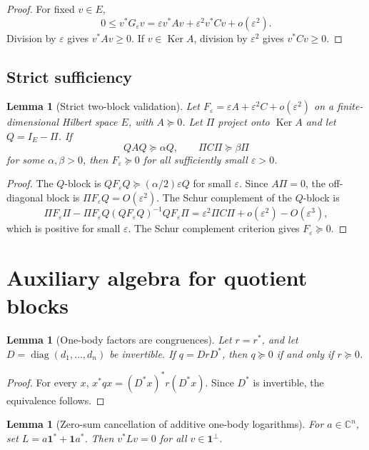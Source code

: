 \documentclass[11pt]{article}
\newtheorem{lemma}[theorem]{Lemma}
\newcommand{\one}{\mathbf 1}
\newcommand{\C}{\mathbb C}
\newcommand{\eps}{\varepsilon}
\newcommand{\diag}{\operatorname{diag}}
\newcommand{\Ker}{\operatorname{Ker}}
\begin{document}
\begin{proof}
For fixed \(v\in E\),
\[
  0\le v^*G_\eps v
  =\eps v^*Av+\eps^2v^*Cv+o(\eps^2).
\]
Division by \(\eps\) gives \(v^*Av\ge0\).  If \(v\in\Ker A\), division by \(\eps^2\) gives \(v^*Cv\ge0\).
\end{proof}

\subsection{Strict sufficiency}

\begin{lemma}[Strict two-block validation]
\label{lem:app-strict-validation}
Let \(F_\eps=\eps A+\eps^2C+o(\eps^2)\) on a finite-dimensional Hilbert space \(E\), with \(A\succeq0\).  Let \(\Pi\) project onto \(\Ker A\) and let \(Q=I_E-\Pi\).  If
\[
  QAQ\succeq\alpha Q,
  \qquad
  \Pi C\Pi\succeq\beta\Pi
\]
for some \(\alpha,\beta>0\), then \(F_\eps\succeq0\) for all sufficiently small \(\eps>0\).
\end{lemma}

\begin{proof}
The \(Q\)-block is \(QF_\eps Q\succeq(\alpha/2)\eps Q\) for small \(\eps\).  Since \(A\Pi=0\), the off-diagonal block is \(\Pi F_\eps Q=O(\eps^2)\).  The Schur complement of the \(Q\)-block is
\[
  \Pi F_\eps\Pi-
  \Pi F_\eps Q(QF_\eps Q)^{-1}QF_\eps\Pi
  =\eps^2\Pi C\Pi+o(\eps^2)-O(\eps^3),
\]
which is positive for small \(\eps\).  The Schur complement criterion gives \(F_\eps\succeq0\).
\end{proof}

\section{Auxiliary algebra for quotient blocks}
\label{app:quotient-algebra}

\begin{lemma}[One-body factors are congruences]
\label{lem:app-one-body}
Let \(r=r^*\), and let \(D=\diag(d_1,\ldots,d_n)\) be invertible.  If \(q=DrD^*\), then \(q\succeq0\) if and only if \(r\succeq0\).
\end{lemma}

\begin{proof}
For every \(x\), \(x^*qx=(D^*x)^*r(D^*x)\).  Since \(D^*\) is invertible, the equivalence follows.
\end{proof}

\begin{lemma}[Zero-sum cancellation of additive one-body logarithms]
\label{lem:app-zero-sum}
For \(a\in\C^n\), set \(L=a\one^*+\one a^*\).  Then \(v^*Lv=0\) for all \(v\in\one^\perp\).
\end{lemma}
\end{document}
